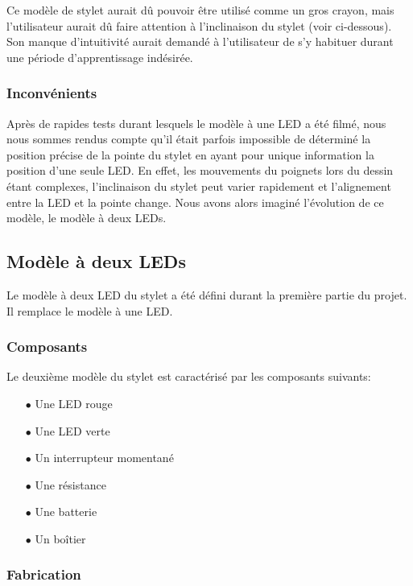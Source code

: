 \documentclass[11pt,a4paper,oldfontcommands]{memoir}
\begin{document}
Ce modèle de stylet aurait dû pouvoir être utilisé comme un gros crayon, mais l'utilisateur aurait dû faire attention à l'inclinaison du stylet (voir ci-dessous). Son manque d'intuitivité aurait demandé à l'utilisateur de s'y habituer durant une période d'apprentissage indésirée.

\subsubsection{Inconvénients}

Après de rapides tests durant lesquels le modèle à une LED a été filmé, nous nous sommes rendus compte qu'il était parfois impossible de déterminé la position précise de la pointe du stylet en ayant pour unique information la position d'une seule LED. En effet, les mouvements du poignets lors du dessin étant complexes, l'inclinaison du stylet peut varier rapidement et l'alignement entre la LED et la pointe change.
Nous avons alors imaginé l'évolution de ce modèle, le modèle à deux LEDs.

\newpage

\subsection{Modèle à deux LEDs}

Le modèle à deux LED du stylet a été défini durant la première partie du projet. Il remplace le modèle à une LED.

\subsubsection{Composants}

Le deuxième modèle du stylet est caractérisé par les composants suivants:

\begin{itemize}
\item[$\bullet$] Une LED rouge
\item[$\bullet$] Une LED verte
\item[$\bullet$] Un interrupteur momentané
\item[$\bullet$] Une résistance
\item[$\bullet$] Une batterie
\item[$\bullet$] Un boîtier
\end{itemize}

\subsubsection{Fabrication}
\end{document}
